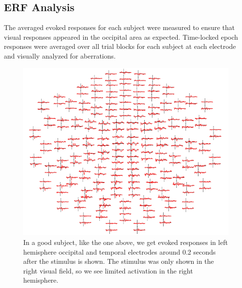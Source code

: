 \documentclass[12pt]{article}
\begin{document}
\subsection{ERF Analysis}
The averaged evoked responses for each subject were measured to ensure that visual responses
appeared in the occipital area as expected. Time-locked epoch responses were averaged over all
trial blocks for each subject at each electrode and visually analyzed for aberrations.

\begin{figure}[h]
  \centering
  \includegraphics[scale=0.8]{good_topomap.PNG}
  \caption{In a good subject, like the one above, we get evoked responses in left hemisphere
  occipital and temporal electrodes around 0.2 seconds after the stimulus is shown. The stimulus
  was only shown in the right visual field, so we see limited activation in the right
  hemisphere.}
  
\end{figure}
\end{document}
